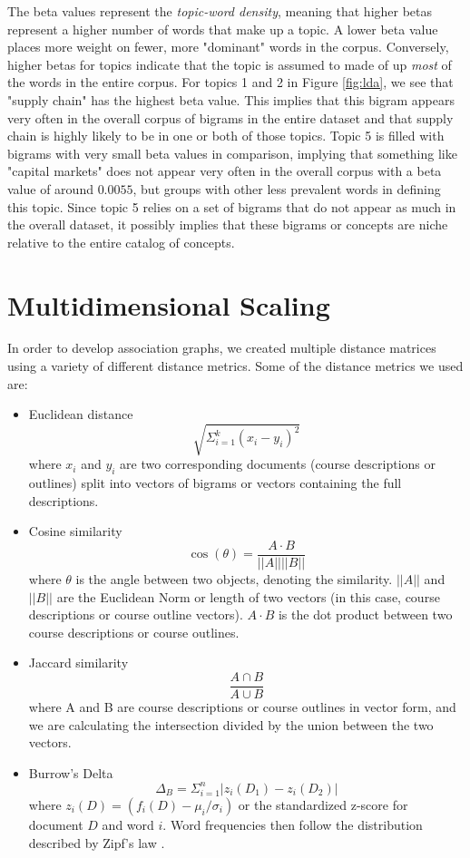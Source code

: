 The beta values represent the \textit{topic-word density}, meaning that higher betas represent a higher number of words that make up a topic.  A lower beta value places more weight on fewer, more "dominant" words in the corpus.  Conversely,  higher betas for topics indicate that the topic is assumed to made of up \textit{most} of the words in the entire corpus.  For topics 1 and 2 in Figure \ref{fig:lda}, we see that "supply chain" has the highest beta value. This implies that this bigram appears very often in the overall corpus of bigrams in the entire dataset and that supply chain is highly likely to be in one or both of those topics.  Topic 5 is filled with bigrams with very small beta values in comparison,  implying that something like "capital markets" does not appear very often in the overall corpus with a beta value of around $0.0055$,  but groups with other less prevalent words in defining this topic.  Since topic 5 relies on a set of bigrams that do not appear as much in the overall dataset, it possibly implies that these bigrams or concepts are niche relative to the entire catalog of concepts.


\section{Multidimensional Scaling}

In order to develop association graphs, we created multiple distance matrices using a variety of different distance metrics.  Some of the distance metrics we used are: 
\begin{itemize}
\item Euclidean distance  
$$\sqrt{\Sigma_{i = 1}^{k}(x_i - y_i)^2}$$
where $x_i$ and $y_i$ are two corresponding documents (course descriptions or outlines) split into vectors of bigrams or vectors containing the full descriptions.
\item Cosine similarity
$$ \cos (\theta) = \frac{A \cdot B}{|| A || || B||}$$
where $\theta$ is the angle between two objects, denoting the similarity.  $||A||$ and $||B||$ are the Euclidean Norm or length of two vectors (in this case, course descriptions or course outline vectors). $A \cdot B$ is the dot product  between two course descriptions or course outlines. 
\item Jaccard similarity  
$$\frac{A \cap B}{A \cup B}$$
where A and B are course descriptions or course outlines in vector form, and we are calculating the intersection divided by the union between the two vectors.
\item Burrow's Delta  \cite{burrow}
$$\Delta_B = \Sigma_{i = 1}^n | z_i(D_1) - z_i(D_2)|$$
where $z_i(D) = (f_i(D) - \mu_i/\sigma_i)$ or the standardized z-score for document $D$ and word $i$.  Word frequencies then follow the distribution described by Zipf's law \cite{zipf2013psycho}. 

\end{itemize} 

